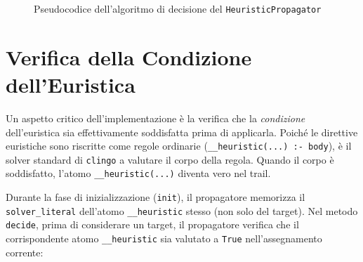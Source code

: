 \documentclass[a4paper,12pt,twoside,openright]{report}
\newcommand{\clingo}{\texttt{clingo}}
\newcommand{\hprop}{\texttt{HeuristicPropagator}}
\begin{document}
\begin{figure}[H]
    \centering
    \caption{Pseudocodice dell'algoritmo di decisione del \hprop{}}
    \label{fig:decide_algorithm}
\end{figure}

\section{Verifica della Condizione dell'Euristica}
\label{sec:verifica_condizione}

Un aspetto critico dell'implementazione \`{e} la verifica che la \emph{condizione} dell'euristica sia effettivamente soddisfatta prima di applicarla. Poich\'{e} le direttive euristiche sono riscritte come regole ordinarie (\texttt{\_\_heuristic(...) :- body}), \`{e} il solver standard di \clingo{} a valutare il corpo della regola. Quando il corpo \`{e} soddisfatto, l'atomo \texttt{\_\_heuristic(...)} diventa vero nel trail.

Durante la fase di inizializzazione (\texttt{init}), il propagatore memorizza il \texttt{solver\_literal} dell'atomo \texttt{\_\_heuristic} stesso (non solo del target). Nel metodo \texttt{decide}, prima di considerare un target, il propagatore verifica che il corrispondente atomo \texttt{\_\_heuristic} sia valutato a \texttt{True} nell'assegnamento corrente:
\end{document}
